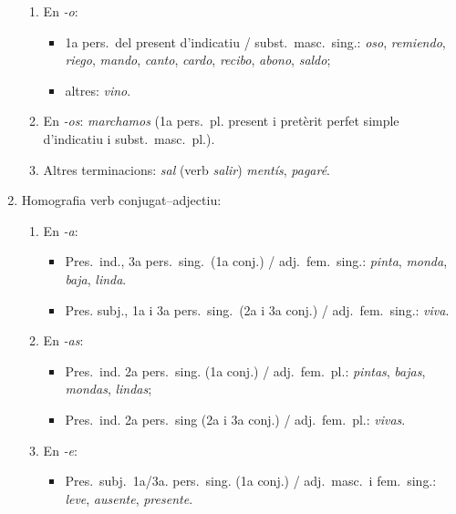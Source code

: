 \begin{enumerate}
\begin{enumerate}
   \item En \emph{-o}: 
   \begin{itemize}
     \item 1a pers.\ del
      present d'indicatiu / subst.\ masc.\ sing.: \emph{oso}, \emph{remiendo}, \emph{riego}, \emph{mando}, 
      \emph{canto}, \emph{cardo}, \emph{recibo}, \emph{abono}, \emph{saldo};
     \item altres: \emph{vino}.
   \end{itemize}  

   \item En \emph{-os}:
       \emph{marchamos} (1a pers.\ pl. present i pretèrit perfet simple
       d'indicatiu i subst.\ masc.\ pl.).

   \item Altres terminacions: \emph{sal} (verb \emph{salir})
       \emph{mentís}, \emph{pagaré}.
  
   
\end{enumerate}
\item Homografia verb conjugat--adjectiu:
 \begin{enumerate}

   \item En \emph{-a}: 
   \begin{itemize}
   \item Pres.\ ind., 3a pers.\  sing.\ (1a conj.) / adj.\ fem.\ sing.: {\em
       pinta}, \emph{monda},
   \emph{ baja}, \emph{linda}.
   \item Pres. subj., 1a i 3a pers.\ sing.\ (2a i 3a conj.) / adj.\ fem.\ sing.:
       \emph{viva}.
   \end{itemize} 

   \item En \emph{-as}:
   \begin{itemize}
   \item Pres.\ ind. 2a pers.\ sing. (1a conj.) / adj.\ fem.\ pl.:
       \emph{pintas}, \emph{bajas}, \emph{mondas}, \emph{lindas};
   \item Pres.\ ind. 2a pers.\ sing (2a i 3a  conj.) / adj.\ fem.\ pl.:
       \emph{vivas}.
   \end{itemize}

   \item En \emph{-e}: 
   \begin{itemize}
   \item Pres.\ subj.\ 1a/3a. pers.\ sing. (1a conj.) / adj.\ masc.\ i fem.\
     sing.: \emph{leve},  \emph{ausente}, \emph{presente}.
   \end{itemize}


\end{enumerate}
\end{enumerate}
